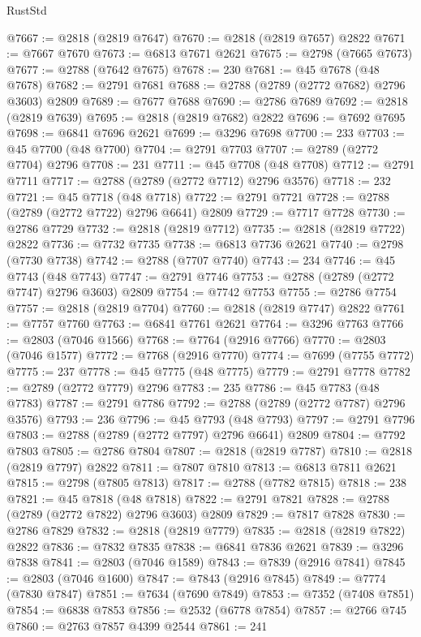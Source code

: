 \begin{lexlean}{RustStd}
\begin{coremodule}
@7667 := @2818 (@2819 @7647)
@7670 := @2818 (@2819 @7657) @2822
@7671 := @7667 @7670
@7673 := @6813 @7671 @2621
@7675 := @2798 (@7665 @7673)
@7677 := @2788 (@7642 @7675)
@7678 := 230
@7681 := @45 @7678 (@48 @7678)
@7682 := @2791 @7681
@7688 := @2788 (@2789 (@2772 @7682) @2796 @3603) @2809
@7689 := @7677 @7688
@7690 := @2786 @7689
@7692 := @2818 (@2819 @7639)
@7695 := @2818 (@2819 @7682) @2822
@7696 := @7692 @7695
@7698 := @6841 @7696 @2621
@7699 := @3296 @7698
@7700 := 233
@7703 := @45 @7700 (@48 @7700)
@7704 := @2791 @7703
@7707 := @2789 (@2772 @7704) @2796
@7708 := 231
@7711 := @45 @7708 (@48 @7708)
@7712 := @2791 @7711
@7717 := @2788 (@2789 (@2772 @7712) @2796 @3576)
@7718 := 232
@7721 := @45 @7718 (@48 @7718)
@7722 := @2791 @7721
@7728 := @2788 (@2789 (@2772 @7722) @2796 @6641) @2809
@7729 := @7717 @7728
@7730 := @2786 @7729
@7732 := @2818 (@2819 @7712)
@7735 := @2818 (@2819 @7722) @2822
@7736 := @7732 @7735
@7738 := @6813 @7736 @2621
@7740 := @2798 (@7730 @7738)
@7742 := @2788 (@7707 @7740)
@7743 := 234
@7746 := @45 @7743 (@48 @7743)
@7747 := @2791 @7746
@7753 := @2788 (@2789 (@2772 @7747) @2796 @3603) @2809
@7754 := @7742 @7753
@7755 := @2786 @7754
@7757 := @2818 (@2819 @7704)
@7760 := @2818 (@2819 @7747) @2822
@7761 := @7757 @7760
@7763 := @6841 @7761 @2621
@7764 := @3296 @7763
@7766 := @2803 (@7046 @1566)
@7768 := @7764 (@2916 @7766)
@7770 := @2803 (@7046 @1577)
@7772 := @7768 (@2916 @7770)
@7774 := @7699 (@7755 @7772)
@7775 := 237
@7778 := @45 @7775 (@48 @7775)
@7779 := @2791 @7778
@7782 := @2789 (@2772 @7779) @2796
@7783 := 235
@7786 := @45 @7783 (@48 @7783)
@7787 := @2791 @7786
@7792 := @2788 (@2789 (@2772 @7787) @2796 @3576)
@7793 := 236
@7796 := @45 @7793 (@48 @7793)
@7797 := @2791 @7796
@7803 := @2788 (@2789 (@2772 @7797) @2796 @6641) @2809
@7804 := @7792 @7803
@7805 := @2786 @7804
@7807 := @2818 (@2819 @7787)
@7810 := @2818 (@2819 @7797) @2822
@7811 := @7807 @7810
@7813 := @6813 @7811 @2621
@7815 := @2798 (@7805 @7813)
@7817 := @2788 (@7782 @7815)
@7818 := 238
@7821 := @45 @7818 (@48 @7818)
@7822 := @2791 @7821
@7828 := @2788 (@2789 (@2772 @7822) @2796 @3603) @2809
@7829 := @7817 @7828
@7830 := @2786 @7829
@7832 := @2818 (@2819 @7779)
@7835 := @2818 (@2819 @7822) @2822
@7836 := @7832 @7835
@7838 := @6841 @7836 @2621
@7839 := @3296 @7838
@7841 := @2803 (@7046 @1589)
@7843 := @7839 (@2916 @7841)
@7845 := @2803 (@7046 @1600)
@7847 := @7843 (@2916 @7845)
@7849 := @7774 (@7830 @7847)
@7851 := @7634 (@7690 @7849)
@7853 := @7352 (@7408 @7851)
@7854 := @6838 @7853
@7856 := @2532 (@6778 @7854)
@7857 := @2766 @745
@7860 := @2763 @7857 @4399 @2544
@7861 := 241

\end{coremodule}
\end{lexlean}
